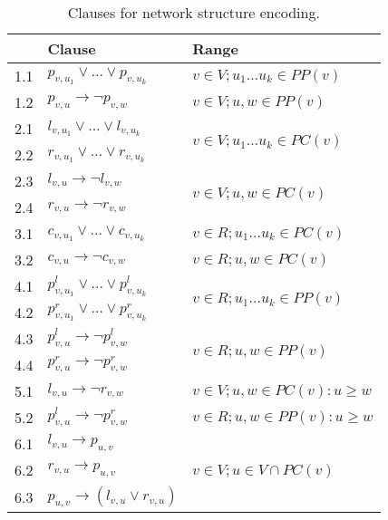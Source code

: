 \documentclass[runningheads, envcountsame, a4paper]{llncs}
\begin{document}
\begin{table}[t]
\centering
\caption{Clauses for network structure encoding.}
\begin{tabular}{l | l | l} %
  \qquad & Clause & Range \\
  
  \hline
  1.1 &
  $p_{v,u_1} \vee \dots \vee p_{v,u_k}$ &
  $v \in V; u_1 \dots u_k \in PP(v)$
  \\
  1.2 &
  $p_{v,u} \rightarrow \neg p_{v,w}$ &
  $v \in V; u, w \in PP(v)$
  \\
  
  \hline
  2.1 &
  $l_{v,u_1} \vee \dots \vee l_{v,u_k}$ &
  \multirow{2}{*}{$v \in V; u_1 \dots u_k \in PC(v)$}
  \\
  2.2 &
  $r_{v,u_1} \vee \dots \vee r_{v,u_k}$ &
  \\
  \hdashline
  
  2.3 &
  $l_{v,u} \rightarrow \neg l_{v,w}$ &
  \multirow{2}{*}{$v \in V; u, w \in PC(v)$}
  \\
  2.4 &
  $r_{v,u} \rightarrow \neg r_{v,w}$ &
  \\
  
  \hline
  3.1 &
  $c_{v,u_1} \vee \dots \vee c_{v,u_k}$ &
  $v \in R; u_1 \dots u_k \in PC(v)$
  \\
  3.2 &
  $c_{v,u} \rightarrow \neg c_{v,w}$ &
  $v \in R; u, w \in PC(v)$
  \\
  
  \hline
  4.1 &
  $p^l_{v,u_1} \vee \dots \vee p^l_{v,u_k}$ &
  \multirow{2}{*}{$v \in R; u_1 \dots u_k \in PP(v)$}
  \\
  4.2 &
  $p^r_{v,u_1} \vee \dots \vee p^r_{v,u_k}$ &
  \\
  \hdashline
  
  4.3 &
  $p^l_{v,u} \rightarrow \neg p^l_{v,w}$ &
  \multirow{2}{*}{$v \in R; u, w \in PP(v)$}
  \\
  4.4 &
  $p^r_{v,u} \rightarrow \neg p^r_{v,w}$ &
  \\

  \hline
  5.1 &
  $l_{v,u} \rightarrow \neg r_{v,w}$ &
  $v \in V; u, w \in PC(v): u \geq w$
  \\
  5.2 &
  $p^l_{v,u} \rightarrow \neg p^r_{v,w}$ &
  $v \in R; u, w \in PP(v) : u \geq w$
  \\
  
  \hline
  6.1 &
  $l_{v,u} \rightarrow p_{u,v}$ &
  \multirow{3}{*}{$v \in V; u \in V \cap PC(v)$}
  \\
  6.2 &
  $r_{v,u} \rightarrow p_{u,v}$ &
  \\
  6.3 &
  $p_{u,v} \rightarrow (l_{v,u} \vee r_{v,u})$ &
  \\
  

\end{tabular}
\end{table}
\end{document}
